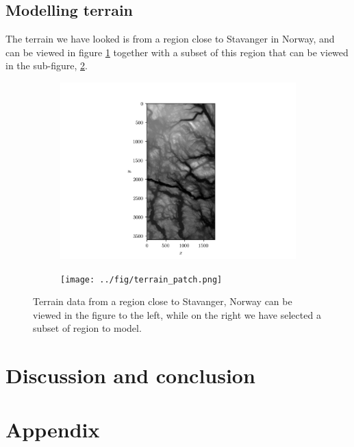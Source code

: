 \documentclass[11pt]{article}
\begin{document}
\subsection{Modelling terrain}
The terrain we have looked is from a region close to Stavanger in Norway, and can be viewed in figure \ref{fig:terrain_map_full} together with a subset of this region that can be viewed in the sub-figure, \ref{fig:terrain_patch}.
\begin{figure}
    \centering
    \begin{subfigure}[b]{0.5\textwidth}
        \centering
        \includegraphics[scale=0.5]{../fig/terrain_data.png}
        \label{fig:terrain_map_full}
    \end{subfigure}%
    \begin{subfigure}[b]{0.5\textwidth}
        \centering
        \texttt{[image: ../fig/terrain\_patch.png]}
        \label{fig:terrain_patch}
    \end{subfigure}
    \caption{Terrain data from a region close to Stavanger, Norway can be viewed in the figure to the left, while on the right we have selected a subset of region to model.}
    \label{fig:terrain}
\end{figure}



\section{Discussion and conclusion}

\section{Appendix} \label{sec:appendix}
\end{document}
